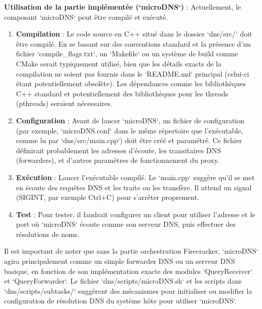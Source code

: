 \documentclass[12pt]{article}
\begin{document}
\textbf{Utilisation de la partie implémentée (`microDNS`)} :
Actuellement, le composant `microDNS` peut être compilé et exécuté.
\begin{enumerate}
    \item \textbf{Compilation} : Le code source en C++ situé dans le dossier `dns/src/` doit être compilé. En se basant sur des conventions standard et la présence d'un fichier `compile_flags.txt`, un `Makefile` ou un système de build comme CMake serait typiquement utilisé, bien que les détails exacts de la compilation ne soient pas fournis dans le `README.md` principal (celui-ci étant potentiellement obsolète). Les dépendances comme les bibliothèques C++ standard et potentiellement des bibliothèques pour les threads (pthreads) seraient nécessaires.
    \item \textbf{Configuration} : Avant de lancer `microDNS`, un fichier de configuration (par exemple, `microDNS.conf` dans le même répertoire que l'exécutable, comme lu par `dns/src/main.cpp`) doit être créé et paramétré. Ce fichier définirait probablement les adresses d'écoute, les transitaires DNS (forwarders), et d'autres paramètres de fonctionnement du proxy.
    \item \textbf{Exécution} : Lancer l'exécutable compilé. Le `main.cpp` suggère qu'il se met en écoute des requêtes DNS et les traite ou les transfère. Il attend un signal (SIGINT, par exemple Ctrl+C) pour s'arrêter proprement.
    \item \textbf{Test} : Pour tester, il faudrait configurer un client pour utiliser l'adresse et le port où `microDNS` écoute comme son serveur DNS, puis effectuer des résolutions de noms.
\end{enumerate}
Il est important de noter que sans la partie orchestration Firecracker, `microDNS` agira principalement comme un simple forwarder DNS ou un serveur DNS basique, en fonction de son implémentation exacte des modules `QueryReceiver` et `QueryForwarder`. Le fichier `dns/scripts/microDNS.sh` et les scripts dans `dns/scripts/subtasks/` suggèrent des mécanismes pour initialiser ou modifier la configuration de résolution DNS du système hôte pour utiliser `microDNS`.

\nocite{*}


\end{document}

